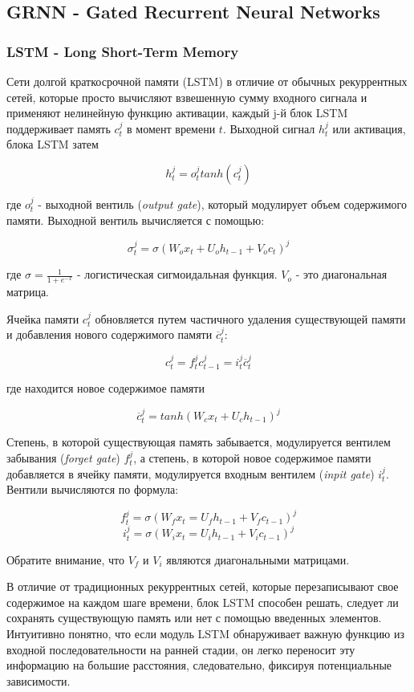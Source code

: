\documentclass[a4paper,russian]{article}
\begin{document}
	\clearpage
	
	\subsection{GRNN - Gated Recurrent Neural Networks}
	\subsubsection{LSTM - Long Short-Term Memory}
	
	Сети долгой краткосрочной памяти (LSTM) в отличие от обычных рекуррентных сетей, которые просто вычисляют взвешенную сумму входного сигнала и применяют нелинейную функцию активации, каждый j-й блок LSTM поддерживает память $c^{j}_{t}$ в момент времени $t$. Выходной сигнал $h^{j}_{t}$ или активация, блока LSTM затем
	
	$$h^{j}_{t} = o^{j}_{t} tanh(c^{j}_{t})$$
	
	где $o^{j}_{t}$  - выходной вентиль (\textit{output gate}), который модулирует объем содержимого памяти. Выходной вентиль вычисляется с помощью:
	
	$$ \sigma^{j}_{t} = \sigma(W_{o} x_{t} + U_{o} h_{t - 1} + V_{o} c_{t})^{j}$$
	
	где $\sigma = \frac{1}{1 + e^{-x}}$ - логистическая сигмоидальная функция. $V_{o}$ - это диагональная матрица.
	
	Ячейка памяти $c^{j}_{t}$ обновляется путем частичного удаления существующей памяти и добавления нового содержимого памяти $\overline{c}_{t}^{j}$:
	
	$$ c^{j}_{t} = f^{j}_{t} c^{j}_{t - 1} = i^{j}_{t} \overline{c}_{t}^{j}$$
	
	где находится новое содержимое памяти
	
	$$ \overline{c}_{t}^{j} = tanh(W_{c} x_{t} + U_{c} h_{t - 1})^j $$
	
	Степень, в которой существующая память забывается, модулируется вентилем забывания (\textit{forget gate}) $f^{j}_{t}$, а степень, в которой новое содержимое памяти добавляется в ячейку памяти, модулируется входным вентилем (\textit{inpit gate}) $i^{j}_{t}$. Вентили вычисляются по формула:
	
	$$ f^{j}_{t} = \sigma(W_f x_t = U_f h_{t - 1} + V_f c_{t - 1})^j $$
	$$ i^{j}_{t} = \sigma(W_i x_t = U_i h_{t - 1} + V_i c_{t - 1})^j $$
	
	Обратите внимание, что $V_f$ и $V_i$ являются диагональными матрицами.
	
	В отличие от традиционных рекуррентных сетей, которые перезаписывают свое содержимое на каждом шаге времени, блок LSTM способен решать, следует ли сохранять существующую память или нет с помощью введенных элементов. Интуитивно понятно, что если модуль LSTM обнаруживает важную функцию из входной последовательности на ранней стадии, он легко переносит эту информацию на большие расстояния, следовательно, фиксируя потенциальные зависимости.
	
\end{document}
